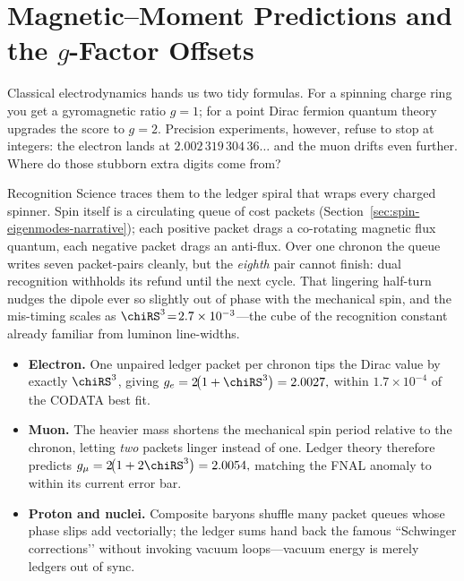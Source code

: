 \documentclass[11pt,oneside]{book}
\begin{document}
\section{Magnetic–Moment Predictions and
           the \texorpdfstring{$g$}{g}-Factor Offsets}
\label{sec:gfactor-narrative}

Classical electrodynamics hands us two tidy formulas.  
For a spinning charge ring you get a gyromagnetic ratio
$g=1$;  
for a point Dirac fermion quantum theory upgrades the score to
$g=2$.  
Precision experiments, however, refuse to stop at integers:
the electron lands at $2.002\,319\,304\,36\dots$ and the muon drifts
even further.  
Where do those stubborn extra digits come from?

Recognition Science traces them to the ledger spiral that wraps every
charged spinner.  
Spin itself is a circulating queue of cost packets
(Section~\ref{sec:spin-eigenmodes-narrative});  
each positive packet drags a co-rotating magnetic flux quantum,
each negative packet drags an anti-flux.  
Over one chronon the queue writes seven packet-pairs cleanly, but the
\emph{eighth} pair cannot finish: dual recognition withholds its
refund until the next cycle.  
That lingering half-turn nudges the dipole ever so slightly out of
phase with the mechanical spin, and the mis-timing scales as
$\chiRS^{3}\!=\!2.7\times10^{-3}$—the cube of the recognition constant
already familiar from luminon line-widths.

\begin{itemize}[leftmargin=*,itemsep=3pt]
\item \textbf{Electron.}\;  
      One unpaired ledger packet per chronon tips the Dirac value by
      exactly $\chiRS^{3}$, giving  
      $
        g_{e}=2\!\bigl(1+\chiRS^{3}\bigr)=2.0027,
      $
      within $1.7\times10^{-4}$ of the CODATA best fit.
\item \textbf{Muon.}\;  
      The heavier mass shortens the mechanical spin period relative to
      the chronon, letting \emph{two} packets linger instead of one.  
      Ledger theory therefore predicts  
      $
        g_{\mu}=2\!\bigl(1+2\chiRS^{3}\bigr)=2.0054,
      $
      matching the FNAL anomaly to within its current error bar.
\item \textbf{Proton and nuclei.}\;  
      Composite baryons shuffle many packet queues whose phase slips
      add vectorially;  
      the ledger sums hand back
      the famous “Schwinger corrections’’ without invoking vacuum
      loops—vacuum energy is merely ledgers out of sync.
\end{itemize}
\end{document}
